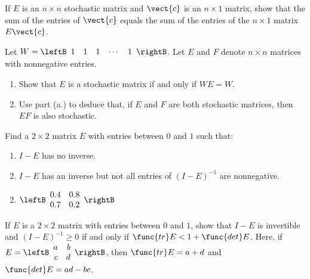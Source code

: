 \begin{multicols}{2}
\begin{ex}
If $E$ is an $n \times n$ stochastic matrix and $\vect{c}$ is an $n \times 1$ matrix, show that the sum of the entries of $\vect{c}$ equals the sum of the entries of the $n \times 1$ matrix $E\vect{c}$.
\end{ex}

\begin{ex}
Let $W = \leftB \begin{array}{ccccc}
1 & 1 & 1 & \cdots & 1
\end{array} \rightB$. Let $E$ and $F$ denote $n \times n$ matrices with nonnegative entries.

\begin{enumerate}[label={\alph*.}]
\item Show that $E$ is a stochastic matrix if and only if $WE = W$.

\item Use part (a.) to deduce that, if $E$ and $F$ are both stochastic matrices, then $EF$ is also stochastic.

\end{enumerate}
\end{ex}

\begin{ex}
Find a $2 \times 2$ matrix $E$ with entries between $0$ and $1$ such that:

\begin{enumerate}[label={\alph*.}]
\item $I - E$ has no inverse.

\item $I - E$ has an inverse but not all entries of $(I - E)^{-1}$ are nonnegative.

\end{enumerate}
\begin{sol}
\begin{enumerate}[label={\alph*.}]
\setcounter{enumi}{1}
\item $\leftB \begin{array}{rr}
0.4 & 0.8 \\
0.7 & 0.2
\end{array} \rightB$

\end{enumerate}
\end{sol}
\end{ex}

\begin{ex}
If $E$ is a $2 \times 2$ matrix with entries between $0$ and $1$, show that $I - E$ is invertible and $(I - E)^{-1} \geq 0$ if and only if $\func{tr }E < 1 + \func{det }E$. Here, if $E = \leftB \begin{array}{rr}
a & b \\
c & d
\end{array} \rightB$,
 then $\func{tr }E = a + d$ and $\func{det }E = ad - bc$.


\end{ex}
\end{multicols}
